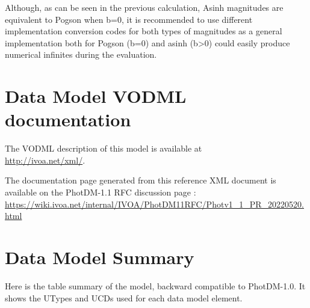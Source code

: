 \documentclass[11pt,a4paper]{ivoa}
\begin{document}
\begin{appendices}
Although, as can be seen in the previous calculation, Asinh magnitudes are equivalent to Pogson
when b=0, it is recommended to use different implementation conversion codes for both types of magnitudes as a general implementation both for Pogson (b=0) and asinh (b>0) could easily produce numerical infinites during the evaluation.
\par
\section{Data Model VODML documentation}

The VODML description of this model is available at \\ \url{http://ivoa.net/xml/}.

The documentation page generated from this reference XML document is available on the PhotDM-1.1 RFC discussion page : \\
\url{https://wiki.ivoa.net/internal/IVOA/PhotDM11RFC/Photv1_1_PR_20220520.html}

\section{Data Model Summary}
Here is the table summary  of the model, backward compatible to PhotDM-1.0.
It shows the UTypes and UCDs used for each data model element.



\end{appendices}
\end{document}
